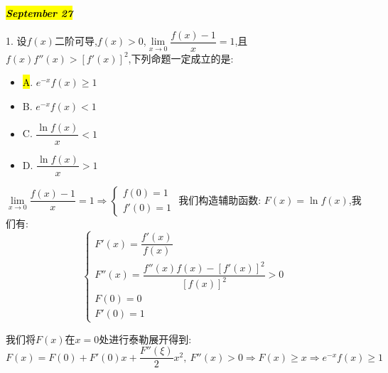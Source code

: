 \hl{\textbf{\textit{September 27}}}

1. 设$f(x)$二阶可导,$f(x)>0$,$\lim\limits_{x\rightarrow 0}\dfrac{f(x)-1}{x}=1$,且$f(x)f''(x)>[f'(x)]^2$,下列命题一定成立的是:  
\begin{itemize}
	\item \hl{A}. $e^{-x}f(x)\geq 1$
	\item B. $e^{-x}f(x)<1$
	\item C. $\dfrac{\ln f(x)}{x}<1$
	\item D. $\dfrac{\ln f(x)}{x}>1$
\end{itemize}
\begin{solution}

	$\lim\limits_{x\rightarrow 0}\dfrac{f(x)-1}{x}=1\Rightarrow \left\lbrace
	\begin{array}{l}
		f(0)=1\\
		f'(0)=1
	\end{array}
	\right. $
	我们构造辅助函数:  $F(x)=\ln f(x)$,我们有:  
	$$\left\lbrace
	\begin{array}{l}
		F'(x)=\dfrac{f'(x)}{f(x)}\\
		F''(x)=\dfrac{f''(x)f(x)-[f'(x)]^2}{[f(x)]^2}>0\\
		F(0)=0\\
		F'(0)=1
	\end{array}
	\right. $$
	
	我们将$F(x)$在$x=0$处进行泰勒展开得到:  
	$$F(x)=F(0)+F'(0)x+\dfrac{F''(\xi)}{2}x^2,\ F''(x)>0\Rightarrow F(x)\geq x\Rightarrow e^{-x}f(x)\geq 1$$
\end{solution}

